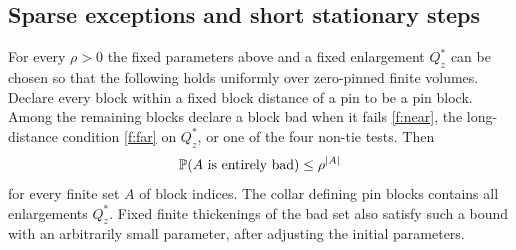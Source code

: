 \subsection{Sparse exceptions and short stationary steps}
\begin{lemma}\label{f:sparse}
For every $\rho>0$ the fixed parameters above and a fixed enlargement
$Q_z^*$ can be chosen so that the following holds uniformly over zero-pinned
finite volumes. Declare every block within a fixed block distance of a pin
to be a pin block. Among the remaining blocks declare a block bad when it
fails \eqref{f:near}, the long-distance condition \eqref{f:far} on $Q_z^*$,
or one of the four non-tie tests. Then
\begin{equation}\label{f:animal}
 \mathbb P(A\text{ is entirely bad})\le\rho^{|A|}
\end{equation}
for every finite set $A$ of block indices. The collar defining pin blocks
contains all enlargements $Q_z^*$. Fixed finite thickenings of the bad set
also satisfy such a bound with an arbitrarily small parameter, after
adjusting the initial parameters.
\end{lemma}
